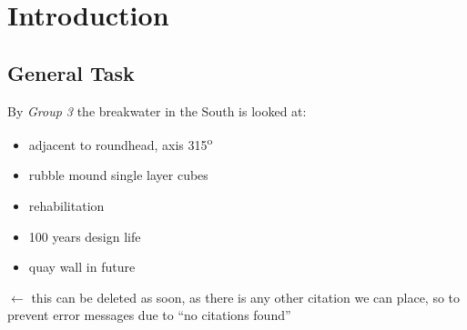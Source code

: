 \chapter{Introduction}

\section{General Task}

By \textit{Group 3} the breakwater in the South is looked at:
\begin{itemize}
 \item adjacent to roundhead, axis 315\textsuperscript{o}
 \item rubble mound single layer cubes
 \item rehabilitation
 \item 100 years design life
 \item quay wall in future
\end{itemize}

\citep{Geim2001} $\leftarrow$ this can be deleted as soon, as there is any other citation we can place, so to prevent error messages due to ``no citations found''